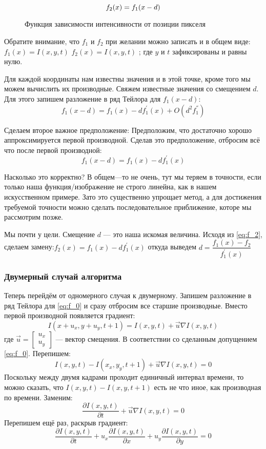 \begin{equation}
\numberwithin{equation}{section}
\label{eq:f_2}
f_2(x)=f_1(x-d)
\end{equation}

\begin{figure}[ht]
\caption{Функция зависимости интенсивности от позиции пикселя}
\label{pic:math_2}
\end{figure}

Обратите внимание, что $f_1$ и $f_2$ при желании можно записать и в общем виде: $f_1(x)=I(x,y,t)$ $f_2(x)=I(x,y,t)$ ; где $y$ и $t$ зафиксированы и равны нулю.

Для каждой координаты нам известны значения и в этой точке, кроме того мы можем вычислить их производные. Свяжем известные значения со смещением $d$. Для этого запишем разложение в ряд Тейлора для $f_1(x-d)$:
$$f_1(x-d)=f_1(x)-df^{'}_1(x)+O(d^2f^{''}_1)$$

Сделаем второе важное предположение: Предположим, что достаточно хорошо аппроксимируется первой производной. Сделав это предположение, отбросим всё что после первой производной:
$$f_1(x-d)=f_1(x)-df_1^{'}(x)$$

Насколько это корректно? В общем—то не очень, тут мы теряем в точности, если только наша функция/изображение не строго линейна, как в нашем искусственном примере. Зато это существенно упрощает метод, а для достижения требуемой точности можно сделать последовательное приближение, которе мы рассмотрим позже.

Мы почти у цели. Смещение $d$ — это наша искомая величина. Исходя из \ref{eq:f_2}, сделаем замену:$f_2(x)=f_1(x)-df_1^{'}(x)$
откуда выведем $d = \dfrac{f_1(x)-f_2}{f_1^{'}(x)}$
\subsubsection{Двумерный случай алгоритма}

Теперь перейдём от одномерного случая к двумерному. Запишем разложение в ряд Тейлора для \ref{eq:f_0} и сразу отбросим все старшие производные. Вместо первой производной появляется градиент:
$$I(x+u_x,y+u_y,t+1)=I(x,y,t)+\overrightarrow{u} \nabla I(x,y,t)$$
где $\overrightarrow{u} = \begin{bmatrix}
u_x\\
u_y
\end{bmatrix} $ — вектор смещения.
В соответствии со сделанным допущением \ref{eq:f_0}. Перепишем:
$$I(x,y,t)-I(x_x,y_y,t+1) + \overrightarrow{u} \nabla I(x,y,t) = 0$$
Поскольку между двумя кадрами проходит единичный интервал времени, то можно сказать, что $I(x,y,t)-I(x,y,t+1)$ есть не что иное, как производная по времени.
Заменим:
$$\frac{\partial I(x,y,t)}{\partial t} + \overrightarrow{u} \nabla I(x,y,t) = 0$$
Перепишем ещё раз, раскрыв градиент:
$$\frac{\partial I(x,y,t)}{\partial t} + u_x\frac{\partial I(x,y,t)}{\partial x} + u_y\frac{\partial I(x,y,t)}{\partial y} = 0$$

